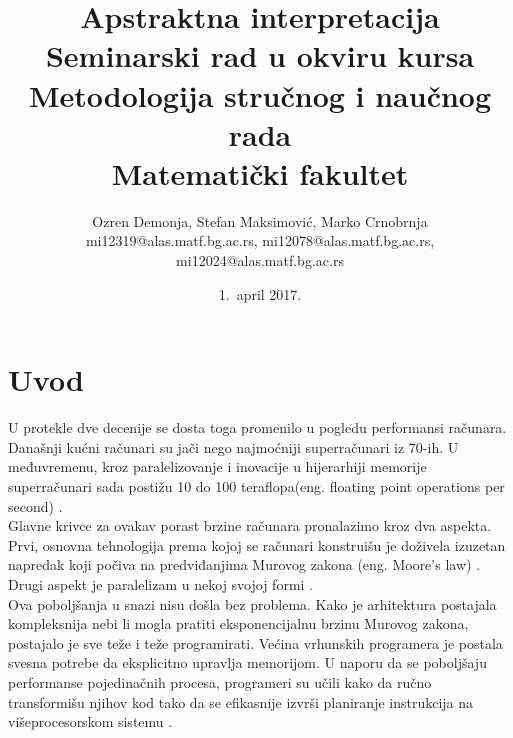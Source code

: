 \documentclass[a4paper]{article}
\begin{document}
\title{Apstraktna interpretacija\\ \small{Seminarski rad u okviru kursa\\Metodologija stručnog i naučnog rada\\ Matematički fakultet}}

\author{Ozren Demonja, Stefan Maksimović, Marko Crnobrnja\\ mi12319@alas.matf.bg.ac.rs, mi12078@alas.matf.bg.ac.rs, mi12024@alas.matf.bg.ac.rs}
\date{1.~april 2017.}
\maketitle


\tableofcontents

\newpage

\section{Uvod}
\label{sec:uvod}
U protekle dve decenije se dosta toga promenilo u pogledu performansi računara. Današnji kućni računari su jači nego najmoćniji superračunari iz 70-ih. U međuvremenu, kroz paralelizovanje i inovacije u hijerarhiji memorije superračunari sada postižu 10 do 100 teraflopa(eng. floating point operations per second) \cite{allen2001optimizing}. \\

Glavne krivce za ovakav porast brzine računara pronalazimo kroz dva aspekta. Prvi, osnovna tehnologija prema kojoj se računari konstruišu je doživela izuzetan napredak koji počiva na predviđanjima Murovog zakona (eng. Moore's law) \cite{Schaller1997MooresLaw}. Drugi aspekt je paralelizam u nekoj svojoj formi \cite{allen2001optimizing}.  \\

Ova poboljšanja u snazi nisu došla bez problema. Kako je arhitektura postajala kompleksnija nebi li mogla pratiti eksponencijalnu brzinu Murovog zakona, postajalo je sve teže i teže programirati. Većina vrhunskih programera je postala svesna potrebe da eksplicitno upravlja memorijom. U naporu da se poboljšaju performanse pojedinačnih procesa, programeri su učili kako da ručno transformišu njihov kod tako da se efikasnije izvrši planiranje instrukcija na višeprocesorskom sistemu \cite{allen2001optimizing}. \\
\end{document}
